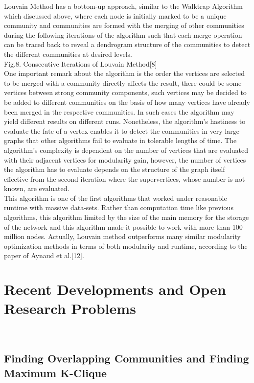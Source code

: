 \documentclass[10pt]{article}
\begin{document}
Louvain Method has a bottom-up approach, similar to the Walktrap Algorithm which discussed above, where each node is initially marked to be a unique community and communities are formed with the merging of other communities during the following iterations of the algorithm such that each merge operation can be traced back to reveal a dendrogram structure of the communities to detect the different communities at desired levels. \\

Fig.8. Consecutive Iterations of Louvain Method[8] \\

One important remark about the algorithm is the order the vertices are selected to be merged with a community directly affects the result, there could be some vertices between strong community components, such vertices may be decided to be added to different communities on the basis of how many vertices have already been merged in the respective communities. In such cases the algorithm may yield different results on different runs.
Nonetheless, the algorithm’s hastiness to evaluate the fate of a vertex enables it to detect the communities in very large graphs that other algorithms fail to evaluate in tolerable lengths of time. The algorithm’s complexity is dependent on the number of vertices that are evaluated with their adjacent vertices for modularity gain, however, the number of vertices the algorithm has to evaluate depends on the structure of the graph itself effective from the second iteration where the supervertices, whose number is not known, are evaluated. \\

This algorithm is one of the first algorithms that worked under reasonable runtime with massive data-sets. Rather than computation time like previous algorithms, this algorithm limited by the size of the main memory for the storage of the network and this algorithm made it possible to work with more than 100 million nodes. Actually, Louvain method outperforms many similar modularity optimization methods in terms of both modularity and runtime, according to the paper of Aynaud et al.[12]. \\

\section{Recent Developments and Open Research Problems} \\

\subsection{Finding Overlapping Communities and Finding Maximum K-Clique} \\
\end{document}
